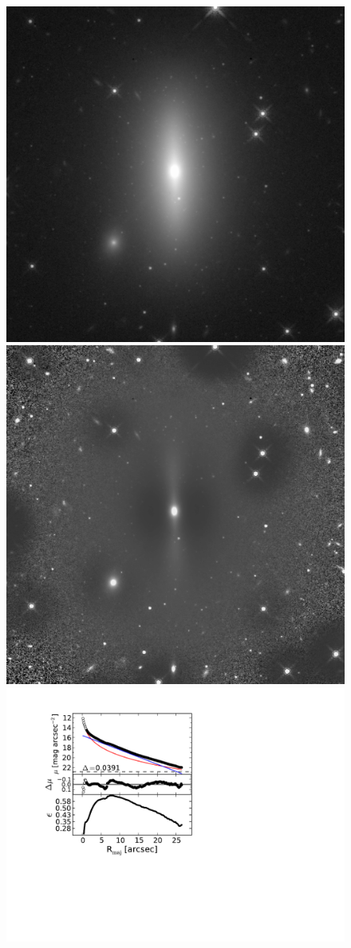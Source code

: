\documentclass[useAMS,usenatbib,article]{mn2e}
\begin{document}
\begin{figure}
\begin{center}
\includegraphics[width=0.49\columnwidth]{images/n1271_image}
\includegraphics[width=0.49\columnwidth]{images/n1271_unsharp} \\
\includegraphics[width=1.05\columnwidth]{images/n1271_decomposition.pdf}
\caption{}
\label{fig:m1216}
\end{center}
\end{figure}
\end{document}
